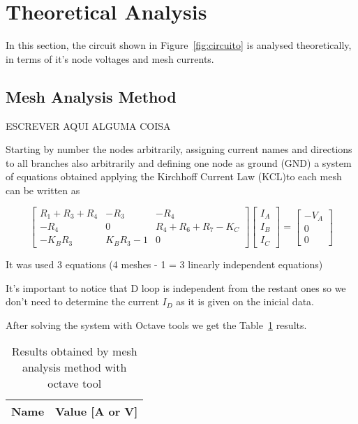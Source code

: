 \section{Theoretical Analysis}
\label{sec:analysis}

\hspace{0,5cm} In this section, the circuit shown in Figure~\ref{fig:circuito} is analysed theoretically, in terms of it's node voltages and mesh currents.

\subsection{Mesh Analysis Method}

\hspace{0,5cm} ESCREVER AQUI ALGUMA COISA

Starting by number the nodes arbitrarily, assigning current names and directions to all branches also arbitrarily and defining one node as ground (GND) a system of equations obtained applying the Kirchhoff Current Law (KCL)to each mesh can be written as 

\begin{equation}
\begin{bmatrix} 
R_1 + R_3 + R_4 & -R_3 & -R_4 \\ 
-R_4 & 0 & R_4 + R_6 + R_7 - K_C\\
-K_B R_3 & K_B R_3 - 1 & 0
\end{bmatrix} 
\begin{bmatrix} 
I_A \\ 
I_B \\ 
I_C
\end{bmatrix} =
\begin{bmatrix} 
-V_A \\ 
0 \\ 
0
\end{bmatrix}
\end{equation}

It was used 3 equations (4 meshes - 1 = 3 linearly independent equations)

It's important to notice that D loop is independent from the restant ones so we don't need to determine the current $I_D$ as it is given on the inicial data.
  
After solving the system with Octave tools we get the Table~\ref{tab:mesh} results.

\begin{table}[h]
  \centering
  \begin{tabular}{|l|r|}
    \hline    
    {\bf Name} & {\bf Value [A or V]} \\ \hline
    
  \end{tabular}
  \caption{ Results obtained by mesh analysis method with octave tool}
  \label{tab:mesh}
\end{table}


